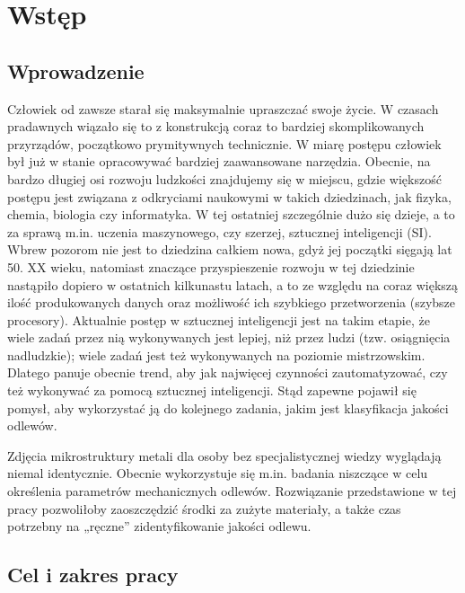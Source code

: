 \chapter{Wstęp}
\label{cha:cha1}

\section{Wprowadzenie}


Człowiek od zawsze starał się maksymalnie upraszczać swoje życie. W czasach pradawnych wiązało się to z konstrukcją coraz to bardziej skomplikowanych przyrządów, początkowo prymitywnych technicznie. W miarę postępu człowiek był już w stanie opracowywać bardziej zaawansowane narzędzia. Obecnie, na bardzo długiej osi rozwoju ludzkości znajdujemy się w miejscu, gdzie większość postępu jest związana z odkryciami naukowymi w takich dziedzinach, jak fizyka, chemia, biologia czy informatyka. W tej ostatniej szczególnie dużo się dzieje, a to za sprawą m.in. uczenia maszynowego, czy szerzej, sztucznej inteligencji (SI). Wbrew pozorom nie jest to dziedzina całkiem nowa, gdyż jej początki sięgają lat 50. XX wieku, natomiast znaczące przyspieszenie rozwoju w tej dziedzinie nastąpiło dopiero w ostatnich kilkunastu latach, a to ze względu na coraz większą ilość produkowanych danych oraz możliwość ich szybkiego przetworzenia (szybsze procesory). Aktualnie postęp w sztucznej inteligencji jest na takim etapie, że wiele zadań przez nią wykonywanych jest lepiej, niż przez ludzi (tzw. osiągnięcia nadludzkie); wiele zadań jest też wykonywanych na poziomie mistrzowskim. Dlatego panuje obecnie trend, aby jak najwięcej czynności zautomatyzować, czy też wykonywać za pomocą sztucznej inteligencji. Stąd zapewne pojawił się pomysł, aby wykorzystać ją do kolejnego zadania, jakim jest klasyfikacja jakości odlewów.

Zdjęcia mikrostruktury metali dla osoby bez specjalistycznej wiedzy wyglądają niemal identycznie. Obecnie wykorzystuje się m.in. badania niszczące w celu określenia parametrów mechanicznych odlewów. Rozwiązanie przedstawione w tej pracy pozwoliłoby zaoszczędzić środki za zużyte materiały, a także czas potrzebny na „ręczne” zidentyfikowanie jakości odlewu.

\section{Cel i zakres pracy}

